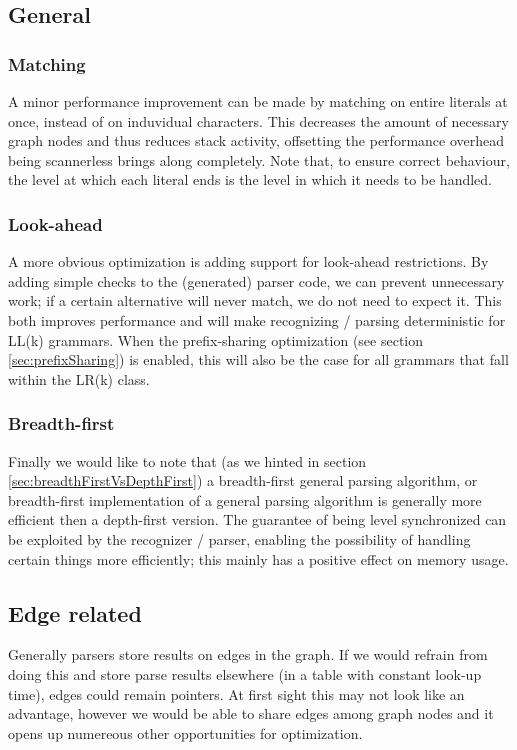 \documentclass[a4paper,10pt]{article}
\begin{document}
\subsection{General}

\subsubsection{Matching}
A minor performance improvement can be made by matching on entire literals at once, instead of on induvidual characters. This decreases the amount of necessary graph nodes and thus reduces stack activity, offsetting the performance overhead being scannerless brings along completely. Note that, to ensure correct behaviour, the level at which each literal ends is the level in which it needs to be handled.

\subsubsection{Look-ahead}
A more obvious optimization is adding support for look-ahead restrictions. By adding simple checks to the (generated) parser code, we can prevent unnecessary work; if a certain alternative will never match, we do not need to expect it. This both improves performance and will make recognizing / parsing deterministic for LL(k) grammars. When the prefix-sharing optimization (see section \ref{sec:prefixSharing}) is enabled, this will also be the case for all grammars that fall within the LR(k) class.

\subsubsection{Breadth-first}
Finally we would like to note that (as we hinted in section \ref{sec:breadthFirstVsDepthFirst}) a breadth-first general parsing algorithm, or breadth-first implementation of a general parsing algorithm is generally more efficient then a depth-first version. The guarantee of being level synchronized can be exploited by the recognizer / parser, enabling the possibility of handling certain things more efficiently; this mainly has a positive effect on memory usage.

\subsection{Edge related}
\label{sec:edgeOptimizations}

Generally parsers store results on edges in the graph. If we would refrain from doing this and store parse results elsewhere (in a table with constant look-up time), edges could remain pointers. At first sight this may not look like an advantage, however we would be able to share edges among graph nodes and it opens up numereous other opportunities for optimization.
\end{document}
